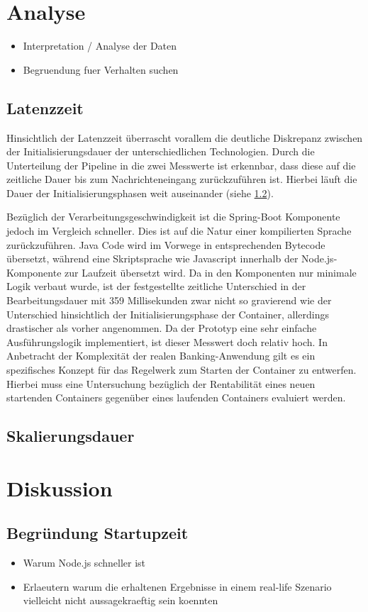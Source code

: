 \section{Analyse}
\begin{itemize}
  \item Interpretation / Analyse der Daten
  \item Begruendung fuer Verhalten suchen
\end{itemize}

\subsection{Latenzzeit}
Hinsichtlich der Latenzzeit überrascht vorallem die deutliche Diskrepanz zwischen der Initialisierungsdauer der unterschiedlichen Technologien. Durch die Unterteilung der Pipeline in die zwei Messwerte ist erkennbar, dass diese auf die zeitliche Dauer bis zum Nachrichteneingang zurückzuführen ist. Hierbei läuft die Dauer der Initialisierungsphasen weit auseinander (siehe \ref{ss:skalierungsdauer}).

Bezüglich der Verarbeitungsgeschwindigkeit ist die Spring-Boot Komponente jedoch im Vergleich schneller. Dies ist auf die Natur einer kompilierten Sprache zurückzuführen. Java Code wird im Vorwege in entsprechenden Bytecode übersetzt, während eine Skriptsprache wie Javascript innerhalb der Node.js-Komponente zur Laufzeit übersetzt wird. Da in den Komponenten nur minimale Logik verbaut wurde, ist der festgestellte zeitliche Unterschied in der Bearbeitungsdauer mit 359  Millisekunden zwar nicht so gravierend wie der Unterschied hinsichtlich der Initialisierungsphase der Container, allerdings drastischer als vorher angenommen. Da der Prototyp eine sehr einfache Ausführungslogik implementiert, ist dieser Messwert doch relativ hoch. In Anbetracht der Komplexität der realen Banking-Anwendung gilt es ein spezifisches Konzept für das Regelwerk zum Starten der Container zu entwerfen. Hierbei muss eine Untersuchung bezüglich der Rentabilität eines neuen startenden Containers gegenüber eines laufenden Containers evaluiert werden.


\subsection{Skalierungsdauer}
\label{ss:skalierungsdauer}



\section{Diskussion}

\subsection{Begr\"undung Startupzeit}
\begin{itemize}
  \item Warum Node.js schneller ist
\end{itemize}

\begin{itemize}
  \item Erlaeutern warum die erhaltenen Ergebnisse in einem real-life Szenario vielleicht nicht aussagekraeftig sein koennten
\end{itemize}
